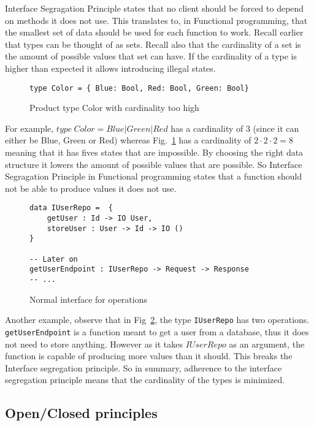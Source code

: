 Interface Segragation Principle states that no client should be forced to depend
on methods it does not use. This translates to, in Functional programming, that
the smallest set of data should be used for each function to work. Recall
earlier that types can be thought of as sets. Recall also that the cardinality
of a set is the amount of possible values that set can have. If the cardinality
of a type is higher than expected it allows introducing illegal states. 

\begin{figure}[H]
    \begin{lstlisting}
type Color = { Blue: Bool, Red: Bool, Green: Bool}
    \end{lstlisting}
    \caption{Product type Color with cardinality too high}
    \label{colorcardinality}
\end{figure}


For example, $type\ Color = Blue | Green | Red$ has a cardinality of 3 (since it
can either be Blue, Green or Red) whereas Fig.~\ref{colorcardinality} has a
cardinality of $2\cdot 2\cdot 2 = 8$ meaning that it has fives states that are
impossible. By choosing the right data structure it lowers the amount of
possible values that are possible. So Interface Segragation Principle in
Functional programming states that a function should not be able to produce
values it does not use.

\begin{figure}[H]
    \begin{lstlisting}
data IUserRepo =  {
	getUser : Id -> IO User,
	storeUser : User -> Id -> IO ()
}

-- Later on
getUserEndpoint : IUserRepo -> Request -> Response
-- ...
    \end{lstlisting}
    \caption{Normal interface for operations}
    \label{twomanyoperations}
\end{figure}


Another example, observe that in Fig~\ref{twomanyoperations}, the type
\texttt{IUserRepo} has two operations. \texttt{getUserEndpoint} is a function
meant to get a user from a database, thus it does not need to store anything.
However as it takes $IUserRepo$ as an argument, the function is capable of
producing more values than it should. This breaks the Interface segregation
principle. So in summary, adherence to the interface segregation principle means
that the cardinality of the types is minimized.

\subsection{Open/Closed principles}\label{openclosed}

